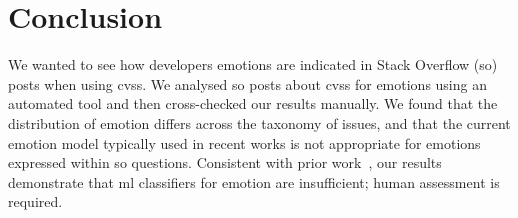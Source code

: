 \section{Conclusion}\label{semotion2021:sec:conclusion}

We wanted to see how developers emotions are indicated in Stack Overflow (\gls{so}) posts when using \glspl{cvs}. We analysed \SEMNumTotalPostsFromSO{} \gls{so} posts about \glspl{cvs} for emotions using an automated tool and then cross-checked our results manually. We found that the distribution of emotion differs across the taxonomy of issues, and that the current emotion model typically used in recent works is not appropriate for emotions expressed within \gls{so} questions. Consistent with prior work~\citep{lin2018sentiment}, our results demonstrate that \gls{ml} classifiers for emotion are insufficient; human assessment is required.
